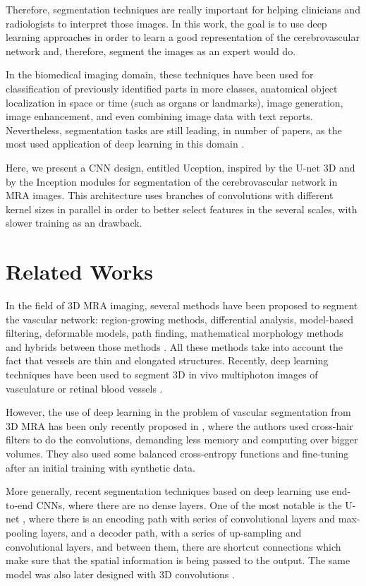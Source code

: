 \documentclass{article}
\begin{document}
Therefore, segmentation techniques are really important for helping clinicians and radiologists to interpret those images. In this work, the goal is to use deep learning approaches in order to learn a good representation of the cerebrovascular network and, therefore, segment the images as an expert would do.

In the biomedical imaging domain, these techniques have been used for classification of previously identified parts in more classes, anatomical object localization in space or time (such as organs or landmarks), image generation, image enhancement, and even combining image data with text reports. Nevertheless, segmentation tasks are still leading, in number of papers, as the most used application of deep learning in this domain \cite{Litjens2017}.

Here, we present a CNN design, entitled Uception, inspired by the U-net 3D \cite{3Dunet} and by the Inception modules \cite{Szegedy2016} for segmentation of the cerebrovascular network in MRA images. This architecture uses branches of convolutions with different kernel sizes in parallel in order to better select features in the several scales, with slower training as an drawback.

\section{Related Works}
In the field of 3D MRA imaging, several methods have been proposed to segment the vascular network: region-growing methods, differential analysis, model-based filtering, deformable models, path finding, mathematical morphology methods and hybrids between those methods \cite{Tankyevych2011}. All these methods take into account the fact that vessels are thin and elongated structures. Recently, deep learning techniques have been used to segment 3D in vivo multiphoton images of vasculature \cite{Haft2018} or retinal blood vessels \cite{Liskowski2016}.



However, the use of deep learning in the problem of vascular segmentation from 3D MRA has been only recently proposed in \cite{Tetteh2018}, where the authors used cross-hair filters to do the convolutions, demanding less memory and computing over bigger volumes. They also used some balanced cross-entropy functions and fine-tuning after an initial training with synthetic data.

More generally, recent segmentation techniques based on deep learning use end-to-end CNNs, where there are no dense layers. One of the most notable is the U-net \cite{Ronneberger2015}, where there is an encoding path with series of convolutional layers and max-pooling layers, and a decoder path, with a series of up-sampling and convolutional layers, and between them, there are shortcut connections which make sure that the spatial information is being passed to the output. The same model was also later designed with 3D convolutions \cite{3Dunet}.
\end{document}
